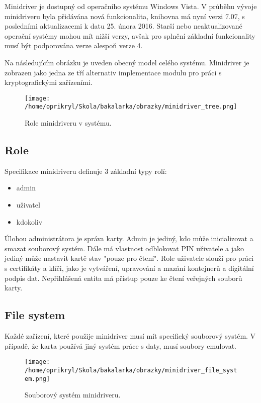 \documentclass[]{fithesis3}
\begin{document}
	Minidriver je dostupný od operačního systému Windows Vista. V průběhu vývoje minidriveru byla		přidávána nová funkcionalita, knihovna má nyní verzi 7.07, s posledními aktualizacemi k datu 		25. února 2016. Starší nebo neaktualizované operační systémy mohou mít nižší verzy, avšak 		pro splnění základní funkcionality musí být podporována verze alespoň verze 4. \newline

	Na následujícím obrázku je uveden obecný model celého systému. Minidriver je zobrazen jako 		jedna ze tří alternativ implementace modulu pro práci s kryptografickými zařízeními. 

		\begin{figure}[!ht]
  			\begin{minipage}{1.00\textwidth}
    				\texttt{[image: /home/oprikryl/Skola/bakalarka/obrazky/minidriver\_tree.png]}
  			\end{minipage}
 			\caption{Role minidriveru v systému.}
  			\label{fig:Role minidriveru v systému.}
		\end{figure}	

		\subsection{Role}
		
		Specifikace minidriveru definuje 3 základní typy rolí:
		\begin{itemize}
			\item admin
			\item uživatel
			\item kdokoliv
		\end{itemize}
		Úlohou administrátora je správa karty. Admin je jediný, kdo může inicializovat a smazat 				souborový systém. Dále má vlastnost odblokovat PIN uživatele a jako jediný může nastavit 			kartě stav "pouze pro čtení". Role uživatele slouží pro práci s certifikáty a klíči, jako je 				vytváření, upravování a mazání kontejnerů a digitální podpis dat. Nepřihlášená entita má 			přístup pouze ke čtení veřejných souborů karty.

		\subsection{File system}
		Každé zařízení, které použije minidriver musí mít specifický souborový systém. V případě, že 		karta používá jiný systém práce s daty, musí soubory emulovat.

		\begin{figure}[!ht]
  			\begin{minipage}{1.00\textwidth}
    				\texttt{[image: /home/oprikryl/Skola/bakalarka/obrazky/minidriver\_file\_system.png]}
  			\end{minipage}
 			\caption{Souborový systém minidriveru.}
  			\label{fig:Souborový systém minidriveru.}
		\end{figure}	
\end{document}
